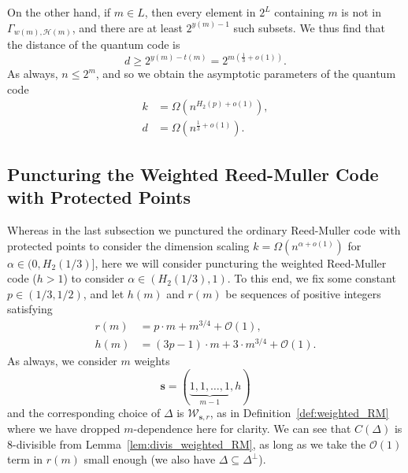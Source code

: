 \documentclass{article}
\begin{document}
On the other hand, if $m \in L$, then every element in $2^L$ containing $m$ is not in $\Gamma_{w(m), \mathcal{H}(m)}$, and there are at least $2^{y(m)-1}$ such subsets. We thus find that the distance of the quantum code is
\begin{equation}
    d \geq 2^{y(m)-t(m)} = 2^{m\left(\frac{1}{3}+o(1)\right)}.
\end{equation}
As always, $n \leq 2^m$, and so we obtain the asymptotic parameters of the quantum code
\begin{align}
    k &= \Omega\left(n^{H_2(p)+o(1)}\right),\\
    d &= \Omega\left(n^{\frac{1}{3}+o(1)}\right).
\end{align}
\subsection{Puncturing the Weighted Reed-Muller Code with Protected Points}\label{subsec:wrm_protect}

Whereas in the last subsection we punctured the ordinary Reed-Muller code with protected points to consider the dimension scaling $k = \Omega\left(n^{\alpha + o(1)}\right)$ for $\alpha \in (0, H_2(1/3)]$, here we will consider puncturing the weighted Reed-Muller code ($h > 1$) to consider $\alpha \in (H_2(1/3),1)$. To this end, we fix some constant $p \in (1/3,1/2)$, and let $h(m)$ and $r(m)$ be sequences of positive integers satisfying
\begin{align}
    r(m) &= p\cdot m + m^{3/4} + \mathcal{O}(1),\\
    h(m) &= (3p-1)\cdot m + 3\cdot m^{3/4} + \mathcal{O}(1).
\end{align}
As always, we consider $m$ weights
\begin{equation}
    \boldsymbol{s} = (\underbrace{1, 1, \ldots, 1}_{m-1}, h)
\end{equation}
and the corresponding choice of $\Delta$ is $\mathcal{W}_{\boldsymbol{s},r}$, as in Definition~\ref{def:weighted_RM} where we have dropped $m$-dependence here for clarity. We can see that $C(\Delta)$ is $8$-divisible from Lemma~\ref{lem:divis_weighted_RM}, as long as we take the $\mathcal{O}(1)$ term in $r(m)$ small enough (we also have $\Delta \subseteq \Delta^\perp$).
\end{document}
